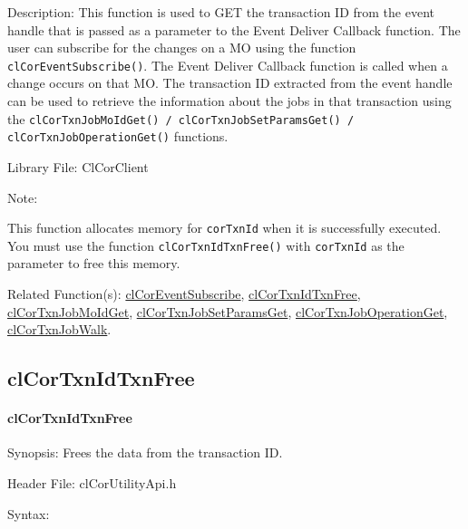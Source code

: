 \begin{flushleft}
\begin{Desc}
\begin{description}
\end{description}
\end{Desc}
\begin{Desc}
\item[Description:] This function is used to GET the transaction ID from the event handle that is passed as a parameter to the Event Deliver Callback 
function. The user can subscribe for the changes on a MO using the function {\tt{clCorEventSubscribe()}}. The Event Deliver Callback function is called 
when a change occurs on that MO. The transaction ID extracted from the event handle can be used to retrieve the information about the jobs in that
transaction using the {\tt{clCorTxnJobMoIdGet() / clCorTxnJobSetParamsGet() / clCorTxnJobOperationGet()}} functions.
\end{Desc}
\begin{Desc}
\item[Library File:]Cl\-Cor\-Client\end{Desc}
\begin{Desc}
\item[Note:] 
\end{Desc} 	
This function allocates memory for {\tt{corTxnId}} when it is successfully executed. You must use the function {\tt{clCorTxnIdTxnFree()}} with 
{\tt{corTxnId}} as the parameter to free this memory.
\begin{Desc}
\item[Related Function(s):]\hyperlink{pagecor133}{clCorEventSubscribe}, \hyperlink{pagecor201}{clCorTxnIdTxnFree}, \hyperlink{pagecor202}{clCorTxnJobMoIdGet}, 
\hyperlink{pagecor203}{clCorTxnJobSetParamsGet}, \hyperlink{pagecor204}{clCorTxnJobOperationGet}, \hyperlink{pagecor205}{clCorTxnJobWalk}.
\end{Desc} 	
\newpage




\subsection{clCorTxnIdTxnFree}
\hypertarget{pagecor201}{}\paragraph{cl\-Cor\-Txn\-Id\-Txn\-Free}\label{pagecor201}
\begin{Desc}
\item[Synopsis:] Frees the data from the transaction ID.
\end{Desc}
\begin{Desc}
\item[Header File:]clCorUtilityApi.h\end{Desc}
\begin{Desc}
\item[Syntax:]


\end{Desc}
\end{flushleft}
